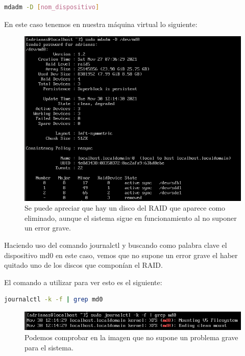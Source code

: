 \begin{lstlisting}[language=bash]
	mdadm -D [nom_dispositivo]
\end{lstlisting}

En este caso tenemos en nuestra máquina virtual lo siguiente:

\begin{figure}[H]
	\centering
	\includegraphics[scale=0.4]{graphics/img1}
	\caption{Se puede apreciar que hay un disco del RAID que aparece como eliminado, aunque el sistema sigue en funcionamiento al no suponer un error grave.}
\end{figure}

Haciendo uso del comando journalctl y buscando como palabra clave el dispositivo md0 en este caso, vemos que no supone un error grave el haber quitado uno de los discos que componían el RAID.

El comando a utilizar para ver esto es el siguiente:

\begin{lstlisting}[language=bash]
	journalctl -k -f | grep md0
\end{lstlisting}

\begin{figure}[H]
	\centering
	\includegraphics[scale=0.4]{graphics/img2}
	\caption{Podemos comprobar en la imagen que no supone un problema grave para el sistema.}
\end{figure}

